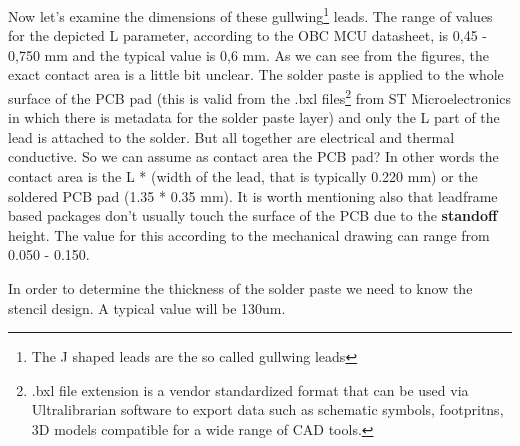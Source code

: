 \documentclass[final]{cubedoc}
\begin{document}
	
	
	
	
	
	Now let's examine the dimensions of these gullwing\footnote{The J shaped leads are the so called gullwing leads} leads. The range of values for the depicted L parameter, according to the OBC MCU datasheet, is 0,45 - 0,750 mm and the typical value is 0,6 mm. As we can see from the figures, the exact contact area is a little bit unclear. The solder paste is applied to the whole surface of the PCB pad (this is valid from the .bxl files\footnote{.bxl file extension is a vendor standardized format that can be used via Ultralibrarian software to export data such as schematic symbols, footpritns, 3D models compatible for a wide range of CAD tools.} from ST Microelectronics in which there is metadata for the solder paste layer) and only the L part of the lead is attached to the solder. But all together are electrical and thermal conductive. So we can assume as contact area the PCB pad? In other words the contact area is the L * (width of the lead, that is typically 0.220 mm) or the soldered PCB pad (1.35 * 0.35 mm). It is worth mentioning also that leadframe based packages don't usually touch the surface of the PCB due to the \textbf{standoff} height. The value for this according to the mechanical drawing can range from 0.050 - 0.150.
	
	In order to determine the thickness of the solder paste we need to know the stencil design. A typical value will be 130um.
	
	
\end{document}
